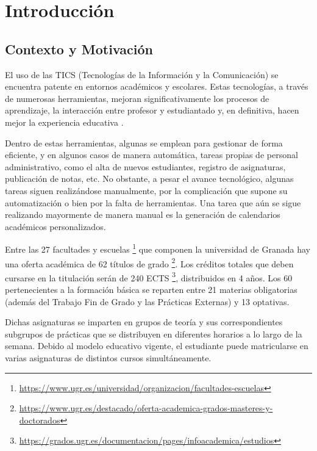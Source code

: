 \chapter{Introducción}


\section{Contexto y Motivación}
El uso de las TICS (Tecnologías de la Información y la Comunicación) se encuentra patente en entornos académicos y escolares. Estas tecnologías, a través de numerosas herramientas, mejoran significativamente los procesos de aprendizaje, la interacción entre profesor y estudiantado y, en definitiva, hacen mejor la experiencia educativa \cite{Flores-Alarcia2012} \cite{Paladines} \cite{TICenLaEducacion}.\newline

Dentro de estas herramientas, algunas se emplean para gestionar de forma eficiente, y en algunos casos de manera automática, tareas propias de personal administrativo, como el alta de nuevos estudiantes, registro de asignaturas, publicación de notas, etc. No obstante, a pesar el avance tecnológico, algunas tareas siguen realizándose manualmente, por la complicación que supone su automatización o bien por la falta de herramientas. Una tarea que aún se sigue realizando mayormente de manera manual es la generación de calendarios académicos personalizados.\newline

Entre las 27 facultades y escuelas \footnote[1]{\url{https://www.ugr.es/universidad/organizacion/facultades-escuelas}} que componen la universidad de Granada hay una oferta académica de 62 títulos de grado \footnote[2]{\url{https://www.ugr.es/destacado/oferta-academica-grados-masteres-y-doctorados}}. Los créditos totales que deben cursarse en la titulación serán de 240 ECTS \footnote[3]{\url{https://grados.ugr.es/documentacion/pages/infoacademica/estudios}}, distribuidos en 4 años. Los 60 pertenecientes a la formación básica se reparten entre 21 materias obligatorias (además del Trabajo Fin de Grado y las Prácticas Externas) y 13 optativas.\newline

Dichas asignaturas se imparten en grupos de teoría y sus correspondientes subgrupos de prácticas que se distribuyen en diferentes horarios a lo largo de la semana. Debido al modelo educativo vigente, el estudiante puede matricularse en varias asignaturas de distintos cursos simultáneamente.\newline

